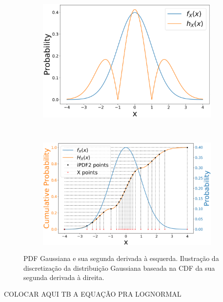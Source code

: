 \begin{figure}[ht]
	\centering
	\begin{subfigure}[b]{0.44\textwidth}
		\centering 
		\includegraphics[width=\textwidth]{./figuras/ddpdf1.pdf}
		\caption{}
		\label{fig:ddPDF1}
	\end{subfigure}
	\hfill
	~ %
	\begin{subfigure}[b]{0.47\textwidth}
		\centering 
		\includegraphics[width=\textwidth]{./figuras/ddpdf2.pdf}
		\caption{}
		\label{fig:ddPDF2}
	\end{subfigure}
	
	\caption{PDF Gaussiana e sua segunda derivada à esquerda. Ilustração da discretização da distribuição Gaussiana baseada na CDF da sua segunda derivada à direita.}
	\label{fig:ddPDF}
\end{figure}
\color{red} COLOCAR AQUI TB A EQUAÇÃO PRA LOGNORMAL \color{black}
